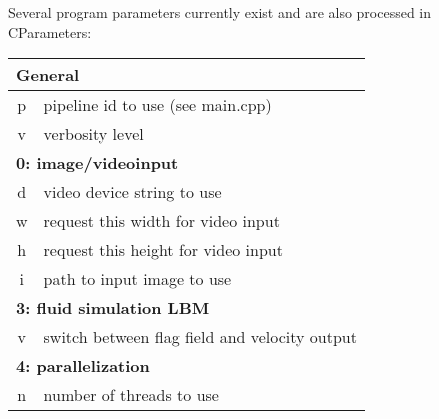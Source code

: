 Several program parameters currently exist and are also processed in
CParameters:

\noindent
\begin{tabular}{|c|l|}
	\hline
	\multicolumn{2}{|l|}{\textbf{General}}	\\
	\hline
	p	& pipeline id to use (see main.cpp)	\\
	\hline
	v	& verbosity level	\\
	\hline
	\hline

	\multicolumn{2}{|l|}{\textbf{0: image/videoinput}}	\\
	\hline
	d	& video device string to use\\
	\hline
	w	& request this width for video input\\
	\hline
	h	& request this height for video input\\
	\hline
	i	& path to input image to use\\
	\hline
	\hline

	\multicolumn{2}{|l|}{\textbf{3: fluid simulation LBM}}	\\
	\hline
	v	& switch between flag field and velocity output	\\
	\hline
	\hline
	
	\multicolumn{2}{|l|}{\textbf{4: parallelization}}	\\
	\hline
	n	& number of threads to use\\
	\hline
	\hline

\end{tabular}
